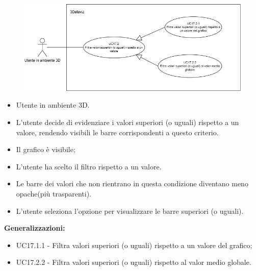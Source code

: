 \begin{figure}[H]\centering
    \includegraphics[scale=0.6]{template/images/UC17.2.png}
    \caption{}
\end{figure}
\UCdsc
{ %
    \begin{itemize}
        \item Utente in ambiente 3D.
    \end{itemize}
}
{ %
    \begin{itemize}
        \item L'utente decide di evidenziare i valori superiori (o uguali) rispetto a un valore, rendendo visibili le barre corrispondenti a questo criterio.
    \end{itemize}
}
{ %
    \begin{itemize}
        \item Il grafico è visibile;
        \item L'utente ha scelto il filtro rispetto a un valore.
    \end{itemize}
}
{ %
    \begin{itemize}
        \item Le barre dei valori che non rientrano in questa condizione diventano meno opache(più trasparenti).
    \end{itemize}
}
{ %
    \begin{itemize}
        \item L'utente seleziona l'opzione per visualizzare le barre superiori (o uguali).
    \end{itemize}
    \item \textbf{Generalizzazioni:} \begin{itemize}
        \item UC17.1.1 - Filtra valori superiori (o uguali) rispetto a un valore del grafico;
        \item UC17.2.2 - Filtra valori superiori (o uguali) rispetto al valor medio globale.
    \end{itemize}
}


